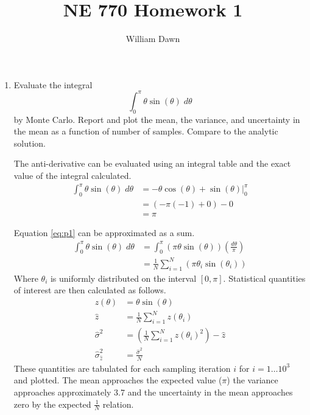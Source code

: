 \documentclass{article}
\title{NE 770 Homework 1}
\author{William Dawn}
\begin{document}
\maketitle

\begin{enumerate}
  \item Evaluate the integral
    \begin{equation} \label{eq:p1}
        \int_0^{\pi} \theta \sin(\theta) \; d\theta
    \end{equation}
    by Monte Carlo. Report and plot the mean, the variance, and uncertainty in
    the mean as a function of number of samples. Compare to the analytic 
    solution.

    The anti-derivative can be evaluated using an integral table and the exact
    value of the integral calculated.
    \begin{align}
      \int_0^{\pi} \theta \sin(\theta) \; d\theta &= \left. - \theta
        \cos(\theta) + \sin(\theta) \right\rvert_0^{\pi} \\
      &= (- \pi (-1) + 0) - 0 \\
      &= \pi
    \end{align}

    Equation \eqref{eq:p1} can be approximated as a sum.
    \begin{align}
      \int_0^{\pi} \theta \sin(\theta) \; d\theta &= 
        \int_0^{\pi} \left( \pi \theta \sin(\theta) \right) \left(
        \frac{d\theta}{\pi} \right) \\
      &= \frac{1}{N} \sum_{i=1}^{N} \left( \pi \theta_i \sin(\theta_i) \right)
    \end{align}
    Where $\theta_i$ is uniformly distributed on the interval $[0,\pi]$.
    Statistical quantities of interest are then calculated as follows.
    \begin{align}
      z(\theta) &= \theta \sin(\theta) \\
      \hat{z} &= \frac{1}{N} \sum_{i=1}^{N} z(\theta_i) \\
      \hat{\sigma}^2 &= \left( \frac{1}{N} \sum_{i=1}^{N} z(\theta_i)^2 \right)
        - \hat{z} \\
      \hat{\sigma}^2_{\hat{z}} &= \frac{\hat{\sigma}^2}{N}
    \end{align}
    These quantities are tabulated for each sampling iteration $i$ for $i = 1
    \ldots 10^3$ and plotted. The mean approaches the expected value ($\pi$) the
    variance approaches approximately 3.7 and the uncertainty in the mean
    approaches zero by the expected $\frac{1}{N}$ relation.


\end{enumerate}
\end{document}
